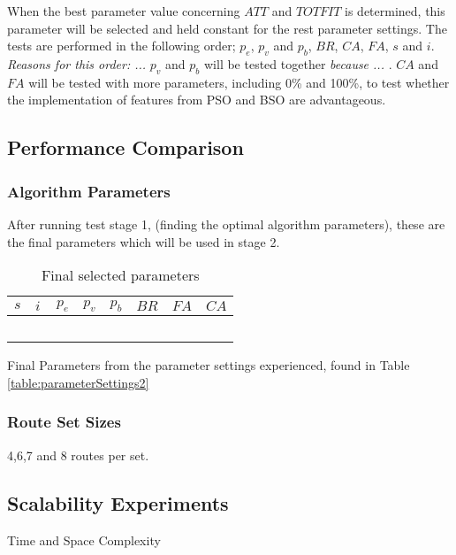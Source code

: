 When the best parameter value concerning $ATT$ and $TOTFIT$ is determined, this parameter will be selected and held constant for the rest parameter settings. The tests are performed in the following order; $p_{e}$, $p_{v}$ and $p_{b}$, $BR$, $CA$, $FA$, $s$ and $i$. \emph{\color{red} Reasons for this order: ... }
$p_{v}$ and $p_{b}$ will be tested together \emph{\color{red}because ... }.
$CA$ and $FA$ will be tested with more parameters, including 0\% and 100\%, to test whether the implementation of features from PSO and BSO are advantageous.

\subsection{Performance Comparison}

\subsubsection{Algorithm Parameters}
After running test stage 1, (finding the optimal algorithm parameters), these are the final parameters which will be used in stage 2.

\begin{table}[H]
	\centering
    \begin{tabular}{|l|l|l|l|l|l|l|l|}
 	\hline
 	$s$ & $i$ & $p_{e}$ & $p_{v}$ & $p_{b}$ & $BR$ & $FA$ & $CA$  \\
 	\hline
    ~ & ~ & ~ & ~ & ~ & ~ & ~ & ~  \\
	\hline
    \end{tabular}
    \caption {Final selected parameters}
    Final Parameters from the parameter settings experienced, found in Table \vref{table:parameterSettings2}
    \label{table:finalParameters}
	\end{table}

\subsubsection{Route Set Sizes}
4,6,7 and 8 routes per set.

\subsection{Scalability Experiments}
Time and Space Complexity
